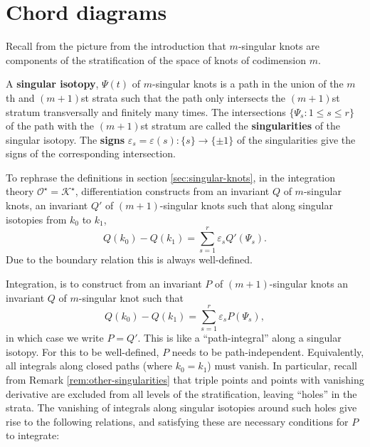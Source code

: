 \section{Chord diagrams}
\label{sec:chord-diagrams}

Recall from the picture from the introduction that \(m\)-singular knots are components of the stratification of the space of knots of codimension \(m\).

\begin{definition}
	A \textbf{singular isotopy}, \(\Psi(t)\) of \(m\)-singular knots is a path in the union of the \(m\)th and \((m + 1)\)st strata such that the path only intersects the \((m + 1)\)st stratum transversally and finitely many times. The intersections \(\{\Psi_{s} : 1 \leq s \leq r\}\) of the path with the \((m + 1)\)st stratum are called the \textbf{singularities} of the singular isotopy. The \textbf{signs} \(\varepsilon_{s} = \varepsilon(s): \{s\} \to \{\pm 1\}\) of the singularities give the signs of the corresponding intersection.
\end{definition}


To rephrase the definitions in section \ref{sec:singular-knots}, in the integration theory \(\mathcal{O}^{\star} = \mathcal{K}^{\star}\), differentiation constructs from an invariant \(Q\) of \(m\)-singular knots, an invariant \(Q'\) of \((m + 1)\)-singular knots such that along singular isotopies from \(k_{0}\) to \(k_{1}\),
\[Q(k_{0}) - Q(k_{1}) = \sum_{s = 1}^{r}\varepsilon_{s} Q'(\Psi_{s}).\]
Due to the boundary relation this is always well-defined.

Integration, is to construct from an invariant \(P\) of \((m + 1)\)-singular knots an invariant \(Q\) of \(m\)-singular knot such that
\[Q(k_{0}) - Q(k_{1}) = \sum_{s = 1}^{r}\varepsilon_{s} P(\Psi_{s}),\]
in which case we write \(P = Q'\). This is like a ``path-integral'' along a singular isotopy. For this to be well-defined, \(P\) needs to be path-independent. Equivalently, all integrals along closed paths (where \(k_{0} = k_{1}\)) must vanish. In particular, recall from Remark \ref{rem:other-singularities} that triple points and points with vanishing derivative are excluded from all levels of the stratification, leaving ``holes'' in the strata. The vanishing of integrals along singular isotopies around such holes give rise to the following relations, and satisfying these are necessary conditions for \(P\) to integrate:

